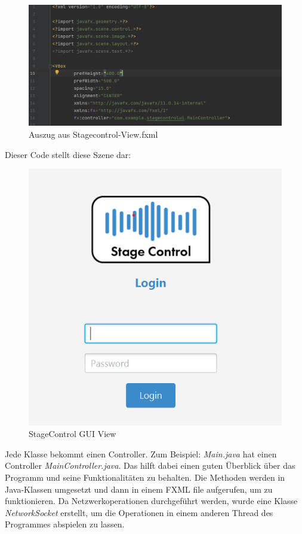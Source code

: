 \begin{figure}[H]
	\centering
	\includegraphics[width=0.9\linewidth]{images/stagecontrol-view.png}
	\caption[Auszug aus Stagecontrol-View.fxml]{Auszug aus Stagecontrol-View.fxml}
	\label{fig:Stagecontrolview}
\end{figure}

\newpage
Dieser Code stellt diese Szene dar:
\begin{figure}[H]
	\centering
	\includegraphics[width=0.7\linewidth]{images/StagecontrolViewGUI.png}
	\caption[StageControl GUI View]{StageControl GUI View}
	\label{fig:StageControlViewGUI}
\end{figure}


Jede Klasse bekommt einen Controller. Zum Beispiel: \textit{Main.java} hat einen Controller \textit{MainController.java}. Das hilft dabei einen guten Überblick über das Programm und seine Funktionalitäten zu behalten. Die Methoden werden in Java-Klassen umgesetzt und dann in einem FXML file aufgerufen, um zu funktionieren. Da Netzwerkoperationen durchgeführt werden, wurde eine Klasse \textit{NetworkSocket} erstellt, um die Operationen in einem anderen Thread des Programmes abspielen zu lassen. 

